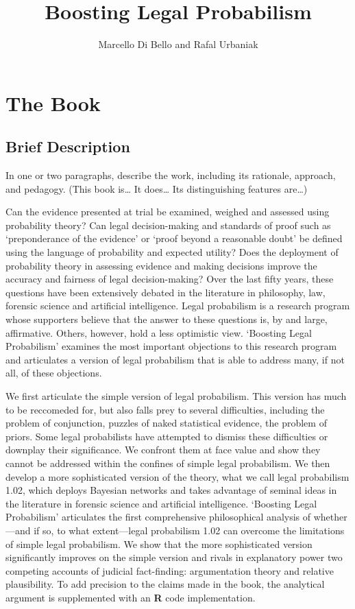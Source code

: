 \documentclass[10pt,dvipsnames,enabledeprecatedfontcommands]{scrartcl}
\title{Boosting Legal Probabilism}
\author{Marcello Di Bello and Rafal Urbaniak}
\date{}
\begin{document}
\maketitle

\hypertarget{the-book}{%
\section{The Book}\label{the-book}}

\hypertarget{brief-description}{%
\subsection{Brief Description}\label{brief-description}}

\footnotesize In one or two paragraphs, describe the work, including its
rationale, approach, and pedagogy. (This book is\ldots{} It does\ldots{}
Its distinguishing features are\ldots{})

\normalsize

Can the evidence presented at trial be examined, weighed and assessed
using probability theory? Can legal decision-making and standards of
proof such as `preponderance of the evidence' or `proof beyond a
reasonable doubt' be defined using the language of probability and
expected utility? Does the deployment of probability theory in assessing
evidence and making decisions improve the accuracy and fairness of legal
decision-making? Over the last fifty years, these questions have been
extensively debated in the literature in philosophy, law, forensic
science and artificial intelligence. Legal probabilism is a research
program whose supporters believe that the answer to these questions is,
by and large, affirmative. Others, however, hold a less optimistic view.
`Boosting Legal Probabilism' examines the most important objections to
this research program and articulates a version of legal probabilism
that is able to address many, if not all, of these objections.

We first articulate the simple version of legal probabilism. This
version has much to be reccomeded for, but also falls prey to several
difficulties, including the problem of conjunction, puzzles of naked
statistical evidence, the problem of priors. Some legal probabilists
have attempted to dismiss these difficulties or downplay their
significance. We confront them at face value and show they cannot be
addressed within the confines of simple legal probabilism. We then
develop a more sophisticated version of the theory, what we call legal
probabilism 1.02, which deploys Bayesian networks and takes advantage of
seminal ideas in the literature in forensic science and artificial
intelligence. `Boosting Legal Probabilism' articulates the first
comprehensive philosophical analysis of whether---and if so, to what
extent---legal probabilism 1.02 can overcome the limitations of simple
legal probabilism. We show that the more sophisticated version
significantly improves on the simple version and rivals in explanatory
power two competing accounts of judicial fact-finding: argumentation
theory and relative plausibility. To add precision to the claims made in
the book, the analytical argument is supplemented with an
\textbf{\textsf{R}} code implementation.
\end{document}
